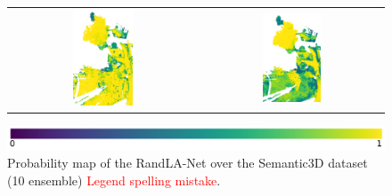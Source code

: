 \begin{figure}[h!]
\begin{tabular}{cc}
            \includegraphics[width=0.33\textwidth, height=0.18\textheight]{images/ood_imgs/de_sem3d/de_prob_10_3.pdf}&
            \includegraphics[width=0.33\textwidth, height=0.18\textheight]{images/sem3d_of/de_prob_sem3d_of_3.pdf}\\
        \end{tabular}
        \includegraphics[scale=0.45]{images/prob_legend.pdf}
        \caption{Probability map of the RandLA-Net over the Semantic3D dataset (10 ensemble) \textcolor{red}{Legend spelling mistake}.}
        \label{fig:de_probmap_vis_sem3d_OF}
    \end{figure}
